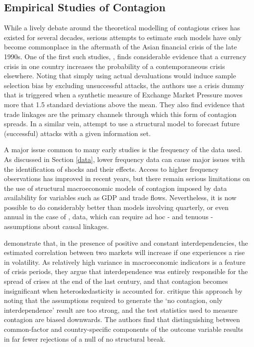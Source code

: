 \documentclass[../base.tex]{subfiles}
\begin{document}
\subsection{Empirical Studies of Contagion}

While a lively debate around the theoretical modelling of contagious crises has existed for several decades, serious attempts to estimate such models have only become commonplace in the aftermath of the Asian financial crisis of the late 1990s. One of the first such studies, \cite{eichengreen1996contagious}, finds considerable evidence that a currency crisis in one country increases the probability of a contemporaneous crisis elsewhere. Noting that simply using actual devaluations would induce sample selection bias by excluding unsuccessful attacks, the authors use a crisis dummy that is triggered when a synthetic measure of Exchange Market Pressure moves more that 1.5 standard deviations above the mean. They also find evidence that trade linkages are the primary channels through which this form of contagion spreads. In a similar vein, \cite{esquivel1998explaining} attempt to use a structural model to forecast future (successful) attacks with a given information set.

A major issue common to many early studies is the frequency of the data used. As discussed in Section \ref{data}, lower frequency data can cause major issues with the identification of shocks and their effects. Access to higher frequency observations has improved in recent years, but there remain serious limitations on the use of structural macroeconomic models of contagion imposed by data availability for variables such as GDP and trade flows. Nevertheless, it is now possible to do considerably better than models involving quarterly, or even annual in the case of \cite{esquivel1998explaining}, data, which can require ad hoc - and tenuous - assumptions about causal linkages.

\cite{forbes2002no} demonstrate that, in the presence of positive and constant interdependencies, the estimated correlation between two markets will increase if one experiences a rise in volatility. As relatively high variance in macroeconomic indicators is a feature of crisis periods, they argue that interdependence was entirely responsible for the spread of crises at the end of the last century, and that contagion becomes insignificant when heteroskedasticity is accounted for. \cite{corsetti2005some} critique this approach by noting that the assumptions required to generate the `no contagion, only interdependence' result are too strong, and the test statistics used to measure contagion are biased downwards. The authors find that distinguishing between common-factor and country-specific components of the outcome variable results in far fewer rejections of a null of no structural break. 
\end{document}
